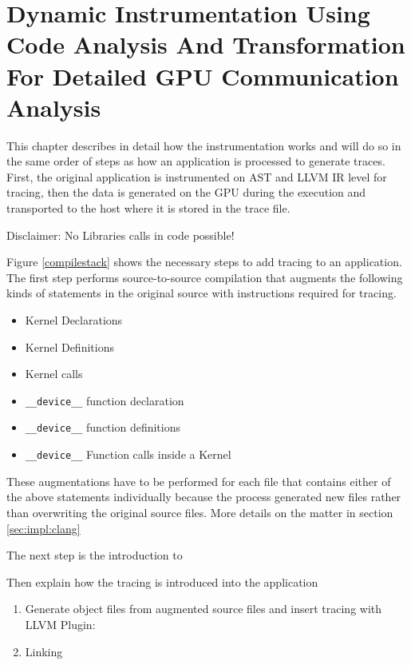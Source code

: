 \chapter{Dynamic Instrumentation Using Code Analysis And Transformation For Detailed GPU Communication Analysis}
This chapter describes in detail how the instrumentation works and will do so in the same order of steps as how an application is processed to generate traces.
First, the original application is instrumented on AST and LLVM IR level for tracing, then the data is generated on the GPU during the execution and transported to the host where it is stored in the trace file.


Disclaimer: No Libraries calls in code possible!

Figure \ref{compilestack} shows the necessary steps to add tracing to an application. The first step performs source-to-source compilation that augments the following kinds of statements in the original source with instructions required
for tracing.
\begin{itemize}
	\item Kernel Declarations
	\item Kernel Definitions
	\item Kernel calls
	\item \verb|__device__| function declaration
	\item \verb|__device__| function definitions
	\item \verb|__device__| Function calls inside a Kernel
\end{itemize}
These augmentations have to be performed for each file that contains either of the above statements individually because the process generated new files
rather than overwriting the original source files. More details on the matter in section \ref{sec:impl:clang}

The next step is the introduction to 

Then explain how the tracing is introduced into the application
\begin{enumerate}
	\item Generate object files from augmented source files and insert tracing with LLVM Plugin:
	\item Linking
\end{enumerate}


